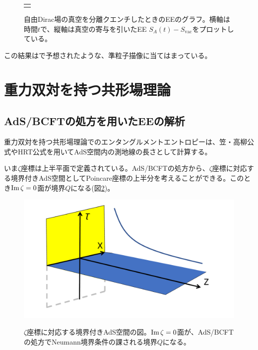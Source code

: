 \begin{figure}[h]
\begin{tabular}{c}
\begin{minipage}{0.50\hsize}
		\end{minipage}
	\end{tabular}
	\caption{自由Dirac場の真空を分離クエンチしたときのEEのグラフ。横軸は時間$t$で、縦軸は真空の寄与を引いたEE $S_A(t)-S_\text{vac}$をプロットしている。}
	\label{fig:sd005}
\end{figure}
この結果は\cite{Calabrese:2007rg}で予想されたような、準粒子描像に当てはまっている。

\section{重力双対を持つ共形場理論}\label{sec:SPQholcft}
\subsection{AdS/BCFTの処方を用いたEEの解析}
重力双対を持つ共形場理論でのエンタングルメントエントロピーは、笠・高柳公式やHRT公式を用いてAdS空間内の測地線の長さとして計算する。

いま$\zeta$座標は上半平面で定義されている。AdS/BCFTの処方から、$\zeta$座標に対応する境界付きAdS空間としてPoincare座標の上半分を考えることができる。このとき$\text{Im}\, \zeta=0$面が境界$Q$になる(図\ref{fig:SQadsbcft})。
\begin{figure}[h]
	\centering
	\includegraphics[width=0.7\linewidth]{UHPadsbcft.pdf}
	\label{fig:SQadsbcft}
	\caption{$\zeta$座標に対応する境界付きAdS空間の図。$\text{Im}\, \zeta=0$面が、AdS/BCFTの処方でNeumann境界条件の課される境界$Q$になる。}
\end{figure}

